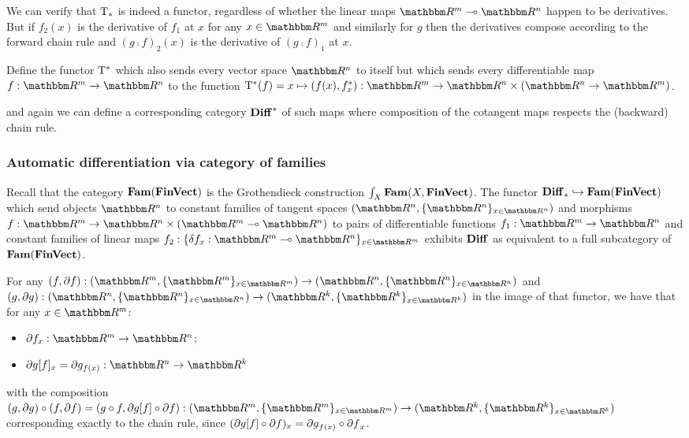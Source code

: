 We can verify that $\mathrm{T}_*$ is indeed a functor, regardless of whether the linear maps $\RR^m \linearto
\RR^n$ happen to be derivatives. But if $f_2(x)$ is the derivative of $f_1$ at $x$ for any $x \in \RR^m$ and
similarly for $g$ then the derivatives compose according to the forward chain rule and $(g \comp f)_2(x)$ is
the derivative of $(g \comp f)_1$ at $x$.

\begin{definition}
Define the functor $\mathrm{T}^*$ which also sends every vector space $\RR^n$ to itself but which sends every
differentiable map $f: \RR^m \to \RR^n$ to the function $\tangents^*(f) = x \mapsto (f(x), \pullf{f}_x): \RR^m
\to \RR^n \times (\RR^n \to \RR^m)$.
\end{definition}

\noindent and again we can define a corresponding category $\mathbf{Diff}^*$ of such maps where composition of the
cotangent maps respects the (backward) chain rule.

\subsubsection{Automatic differentiation via category of families}

Recall that the category $\mathbf{Fam}(\mathbf{FinVect})$ is the Grothendieck construction $\int_{X}\mathbf{Fam}(X,
\mathbf{FinVect})$. The functor $\mathbf{Diff}_* \hookrightarrow \mathbf{Fam}(\mathbf{FinVect})$ which send objects $\RR^n$ to constant
families of tangent spaces $(\RR^n, \{\RR^n\}_{x \in \RR^n})$ and morphisms $f: \RR^m \to \RR^n \times (\RR^m
\linearto \RR^n)$ to pairs of differentiable functions $f_1: \RR^m \to \RR^n$ and constant families of linear
maps $f_2: \{\delta f_x: \RR^m \linearto \RR^n\}_{x \in \RR^m}$ exhibits $\mathbf{Diff}$ as equivalent to a full
subcategory of $\mathbf{Fam}(\mathbf{FinVect})$.

For any $(f, \partial f): (\RR^m, \{\RR^m\}_{x \in \RR^m}) \to (\RR^n, \{\RR^n\}_{x \in \RR^n})$ and $(g,
\partial g): (\RR^n, \{\RR^n\}_{x \in \RR^n}) \to (\RR^k, \{\RR^k\}_{x \in \RR^k})$ in the image of that
functor, we have that for any $x \in \RR^m$:
\begin{itemize}
\item $\partial f_x: \RR^m \to \RR^n$;
\item $\reindex{\partial g}{f}_x = \partial g_{f(x)}: \RR^n \to \RR^k$
\end{itemize}

\noindent with the composition $(g, \partial g) \comp (f, \partial f) = (g \comp f, \reindex{\partial g}{f}
\comp \partial f): (\RR^m, \{\RR^m\}_{x \in \RR^m}) \to (\RR^k, \{\RR^k\}_{x \in \RR^k})$ corresponding
exactly to the chain rule, since $(\partial g[f] \circ \partial f)_x = {\partial g}_{f(x)} \circ
{\partial f}_x$.

